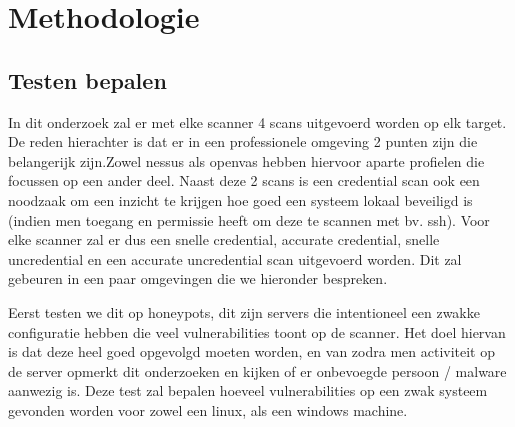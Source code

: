 
\chapter{Methodologie}
\label{ch:methodologie}






\section{Testen bepalen}

In dit onderzoek zal er met elke scanner 4 scans uitgevoerd worden op elk target. De reden hierachter is dat er in een professionele omgeving 2 punten zijn die belangerijk zijn.Zowel nessus als openvas hebben hiervoor aparte profielen die focussen op een ander deel. Naast deze 2 scans is een credential scan ook een noodzaak om een inzicht te krijgen hoe goed een systeem lokaal beveiligd is (indien men toegang en permissie heeft om deze te scannen met bv. ssh). Voor elke scanner zal er dus een snelle credential, accurate credential, snelle uncredential en een accurate uncredential scan uitgevoerd worden. Dit zal gebeuren in een paar omgevingen die we hieronder bespreken.

Eerst testen we dit op honeypots, dit zijn servers die intentioneel een zwakke configuratie hebben die veel vulnerabilities toont op de scanner. Het doel hiervan is dat deze heel goed opgevolgd moeten worden, en van zodra men activiteit op de server opmerkt dit onderzoeken en kijken of er onbevoegde persoon / malware aanwezig is. Deze test zal bepalen hoeveel vulnerabilities op een zwak systeem gevonden worden voor zowel een linux, als een windows machine.

